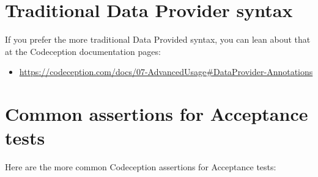 \documentclass[a4paperpaper,openright]{book}
\providecommand{\tightlist}{%
  \setlength{\itemsep}{0pt}\setlength{\parskip}{0pt}}
\begin{document}
\hypertarget{traditional-data-provider-syntax}{%
\section{Traditional Data Provider
syntax}\label{traditional-data-provider-syntax}}

If you prefer the more traditional Data Provided syntax, you can lean
about that at the Codeception documentation pages:

\begin{itemize}
\tightlist
\item
  \url{https://codeception.com/docs/07-AdvancedUsage\#DataProvider-Annotations}
\end{itemize}

\hypertarget{common-assertions-for-acceptance-tests}{%
\section{Common assertions for Acceptance
tests}\label{common-assertions-for-acceptance-tests}}

Here are the more common Codeception assertions for Acceptance tests:
\end{document}
